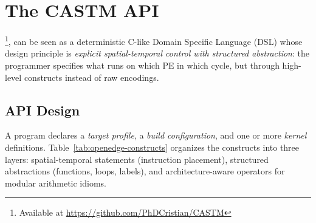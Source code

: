 \section{The CASTM API}
\label{sec:openedge}

\castm{}\footnote{Available at \url{https://github.com/PhDCristian/CASTM}}, can be seen as a deterministic C-like Domain Specific Language (DSL) whose design principle is \emph{explicit spatial-temporal control with structured abstraction}: the programmer specifies what runs on which PE in which cycle, but through high-level constructs instead of raw encodings.

\subsection{API Design}
\label{subsec:lang-overview}

A \castm{} program declares a \emph{target profile}, a \emph{build configuration}, and one or more \emph{kernel} definitions. Table~\ref{tab:openedge-constructs} organizes the constructs into three layers: spatial-temporal statements (instruction placement), structured abstractions (functions, loops, labels), and architecture-aware operators for modular arithmetic idioms.

